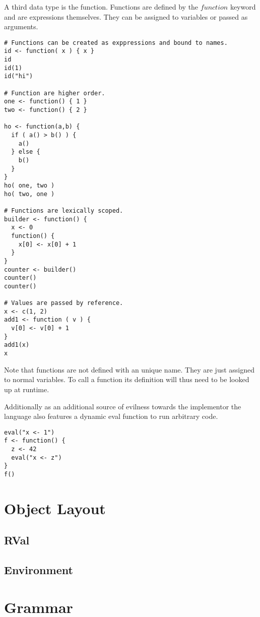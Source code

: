 A third data type is the function. Functions are defined by the $function$ keyword and are expressions themselves. They can be assigned to variables or passed as arguments.

\begin{lstlisting}[language=rift]
# Functions can be created as exppressions and bound to names.
id <- function( x ) { x }
id
id(1)
id("hi")

# Function are higher order.
one <- function() { 1 }
two <- function() { 2 }

ho <- function(a,b) {
  if ( a() > b() ) {
    a()
  } else {
    b()
  }
}
ho( one, two )
ho( two, one )

# Functions are lexically scoped.
builder <- function() {
  x <- 0
  function() {
    x[0] <- x[0] + 1
  }
}
counter <- builder()
counter()
counter()

# Values are passed by reference.
x <- c(1, 2)
add1 <- function ( v ) {
  v[0] <- v[0] + 1
}
add1(x)
x
\end{lstlisting}

Note that functions are not defined with an unique name. They are just assigned to normal variables. To call a function its definition will thus need to be looked up at runtime.

Additionally as an additional source of evilness towards the implementor the language also features a dynamic eval function to run arbitrary code.

\begin{lstlisting}[language=rift]
eval("x <- 1")
f <- function() {
  z <- 42
  eval("x <- z")
}
f()
\end{lstlisting}

\section{Object Layout}

\subsection{RVal}
\subsection{Environment}

\section{Grammar}
